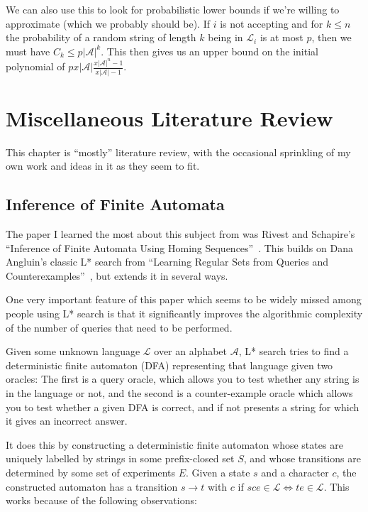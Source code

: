 \documentclass[a4paper]{book}
\begin{document}
We can also use this to look for probabilistic lower bounds if we're willing to approximate (which we probably should be).
If \(i\) is not accepting and for \(k \leq n\) the probability of a random string of length \(k\) being in \(\mathcal{L}_i\) is at most \(p\),
then we must have \(C_k \leq p |\mathcal{A}|^k\).
This then gives us an upper bound on the initial polynomial of \(p x |\mathcal{A}| \frac{{x |\mathcal{A}|}^n - 1}{x |\mathcal{A}| - 1}\).

\chapter{Miscellaneous Literature Review}

This chapter is ``mostly'' literature review,
with the occasional sprinkling of my own work and ideas in it as they seem to fit.

\section{Inference of Finite Automata}\label{sec:langinference}

The paper I learned the most about this subject from was Rivest and Schapire's ``Inference of Finite Automata Using Homing Sequences''~\cite{DBLP:journals/iandc/RivestS93}.
This builds on Dana Angluin's classic L* search from ``Learning Regular Sets from Queries and Counterexamples''~\cite{DBLP:journals/iandc/Angluin87},
but extends it in several ways.

One very important feature of this paper which seems to be widely missed among people using L* search is that it significantly improves the algorithmic complexity of the number of queries that need to be performed.

Given some unknown language \(\mathcal{L}\) over an alphabet \(\mathcal{A}\),
L* search tries to find a deterministic finite automaton (DFA) representing that language given two oracles:
The first is a query oracle,
which allows you to test whether any string is in the language or not,
and the second is a counter-example oracle which allows you to test whether a given DFA is correct,
and if not presents a string for which it gives an incorrect answer.

It does this by constructing a deterministic finite automaton whose states are uniquely labelled by strings in some prefix-closed set \(S\),
and whose transitions are determined by some set of experiments \(E\).
Given a state \(s\) and a character \(c\),
the constructed automaton has a transition \(s \to t\) with \(c\) if \(sce \in \mathcal{L} \iff te \in \mathcal{L}\).
This works because of the following observations:
\end{document}
